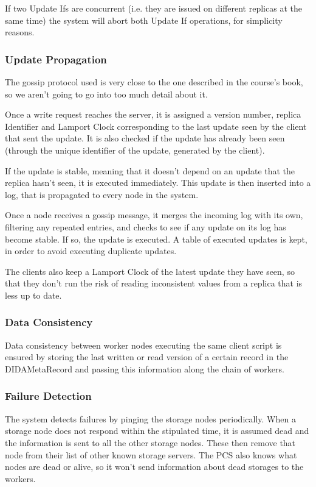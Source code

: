 \documentclass[times, 10pt,twocolumn]{article}
\begin{document}
If two Update Ifs are concurrent (i.e. they are issued on different replicas at the same time) the system will abort both Update If operations, for simplicity reasons.

\subsubsection{Update Propagation}

The gossip protocol used is very close to the one described in the course's book, so we aren't going to go into too much detail about it.

Once a write request reaches the server, it is assigned a version number, replica Identifier and Lamport Clock corresponding to the last update seen by the client that sent the update.
It is also checked if the update has already been seen (through the unique identifier of the update, generated by the client).

If the update is stable, meaning that it doesn't depend on an update that the replica hasn't seen, it is executed immediately. 
This update is then inserted into a log, that is propagated to every node in the system.

Once a node receives a gossip message, it merges the incoming log with its own, filtering any repeated entries, and checks to 
see if any update on its log has become stable. If so, the update is executed.
A table of executed updates is kept, in order to avoid executing duplicate updates.

The clients also keep a Lamport Clock of the latest update they have seen, so that they don't run the risk of reading inconsistent values from a replica that is less up to date.


\subsubsection{Data Consistency}

Data consistency between worker nodes executing the same client script is ensured by storing the last written or read version of a certain record 
in the DIDAMetaRecord and passing this information along the chain of workers.

\subsubsection{Failure Detection}

The system detects failures by pinging the storage nodes periodically. When a storage node does not respond within the stipulated time, it is assumed dead and the 
information is sent to all the other storage nodes. These then remove that node from their list of other known storage servers. The PCS also knows what nodes are dead or alive,
so it won't send information about dead storages to the workers.
\end{document}
